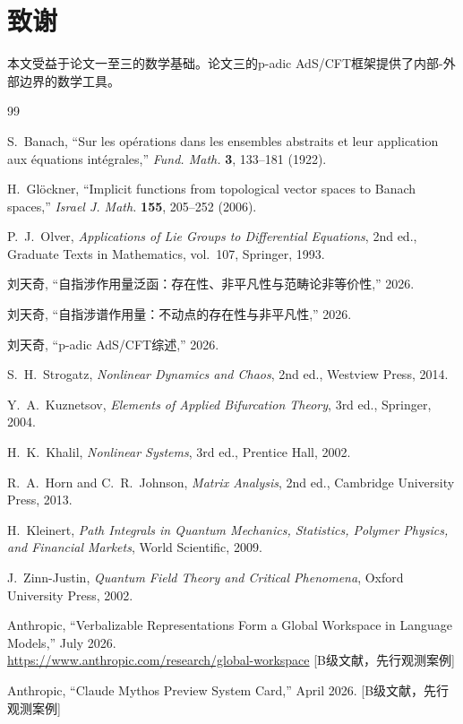 \documentclass[12pt,a4paper]{article}
\theoremstyle{definition}
\begin{document}
\section*{致谢}

本文受益于论文一至三的数学基础。论文三的p-adic AdS/CFT框架提供了内部-外部边界的数学工具。

\begin{thebibliography}{99}

S.~Banach, ``Sur les op\'erations dans les ensembles abstraits et leur application aux \'equations int\'egrales,''
\textit{Fund. Math.} \textbf{3}, 133--181 (1922).

H.~Gl\"ockner, ``Implicit functions from topological vector spaces to Banach spaces,''
\textit{Israel J. Math.} \textbf{155}, 205--252 (2006).

P.~J.~Olver, \textit{Applications of Lie Groups to Differential Equations},
2nd ed., Graduate Texts in Mathematics, vol.~107, Springer, 1993.

刘天奇, ``自指涉作用量泛函：存在性、非平凡性与范畴论非等价性,'' 2026.

刘天奇, ``自指涉谱作用量：不动点的存在性与非平凡性,'' 2026.

刘天奇, ``p-adic AdS/CFT综述,'' 2026.

S.~H.~Strogatz, \textit{Nonlinear Dynamics and Chaos}, 2nd ed., Westview Press, 2014.

Y.~A.~Kuznetsov, \textit{Elements of Applied Bifurcation Theory}, 3rd ed., Springer, 2004.

H.~K.~Khalil, \textit{Nonlinear Systems}, 3rd ed., Prentice Hall, 2002.

R.~A.~Horn and C.~R.~Johnson, \textit{Matrix Analysis}, 2nd ed., Cambridge University Press, 2013.

H.~Kleinert, \textit{Path Integrals in Quantum Mechanics, Statistics, Polymer Physics, and Financial Markets}, World Scientific, 2009.

J.~Zinn-Justin, \textit{Quantum Field Theory and Critical Phenomena}, Oxford University Press, 2002.

Anthropic, ``Verbalizable Representations Form a Global Workspace in Language Models,'' July 2026.\\
\url{https://www.anthropic.com/research/global-workspace}
[B级文献，先行观测案例]

Anthropic, ``Claude Mythos Preview System Card,'' April 2026.
[B级文献，先行观测案例]

\end{thebibliography}
\end{document}
